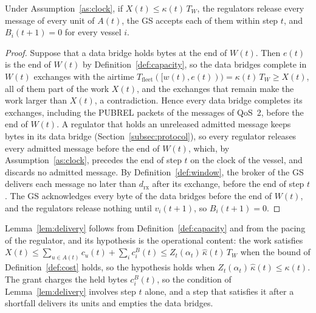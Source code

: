 \begin{lemma}\label{lem:delivery}
Under Assumption~\ref{as:clock}, if $X(t) \leq \kappa(t)\,T_W$, the regulators release every message of every unit of $A(t)$, the GS accepts each of them within step $t$, and $B_i(t+1) = 0$ for every vessel $i$.
\end{lemma}
\begin{proof}
Suppose that a data bridge holds bytes at the end of $W(t)$. Then $e(t)$ is the end of $W(t)$ by Definition~\ref{def:capacity}, so the data bridges complete in $W(t)$ exchanges with the airtime $T_{\mathrm{fleet}}([w(t), e(t))) = \kappa(t)\,T_W \geq X(t)$, all of them part of the work $X(t)$, and the exchanges that remain make the work larger than $X(t)$, a contradiction. Hence every data bridge completes its exchanges, including the PUBREL packets of the messages of QoS~2, before the end of $W(t)$. A regulator that holds an unreleased admitted message keeps bytes in its data bridge (Section~\ref{subsec:protocol}), so every regulator releases every admitted message before the end of $W(t)$, which, by Assumption~\ref{as:clock}, precedes the end of step $t$ on the clock of the vessel, and discards no admitted message. By Definition~\ref{def:window}, the broker of the GS delivers each message no later than $d_{\mathrm{rx}}$ after its exchange, before the end of step $t$. The GS acknowledges every byte of the data bridges before the end of $W(t)$, and the regulators release nothing until $v_i(t+1)$, so $B_i(t+1) = 0$.
\end{proof}

Lemma~\ref{lem:delivery} follows from Definition~\ref{def:capacity} and from the pacing of the regulator, and its hypothesis is the operational content: the work satisfies $X(t) \leq \sum_{u \in A(t)} c_u(t) + \sum_{i} c^B_i(t) \leq Z_t(\alpha_t)\,\hat{\kappa}(t)\,T_W$ when the bound of Definition~\ref{def:cost} holds, so the hypothesis holds when $Z_t(\alpha_t)\,\hat{\kappa}(t) \leq \kappa(t)$. The grant charges the held bytes $c^B_i(t)$, so the condition of Lemma~\ref{lem:delivery} involves step $t$ alone, and a step that satisfies it after a shortfall delivers its units and empties the data bridges.

